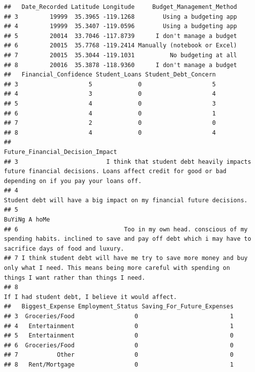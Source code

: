 \documentclass[
]{article}
\begin{document}
\begin{verbatim}
##   Date_Recorded Latitude Longitude     Budget_Management_Method
## 3         19999  35.3965 -119.1268        Using a budgeting app
## 4         19999  35.3407 -119.0596        Using a budgeting app
## 5         20014  33.7046 -117.8739      I don't manage a budget
## 6         20015  35.7768 -119.2414 Manually (notebook or Excel)
## 7         20015  35.3044 -119.1031          No budgeting at all
## 8         20016  35.3878 -118.9360      I don't manage a budget
##   Financial_Confidence Student_Loans Student_Debt_Concern
## 3                    5             0                    5
## 4                    3             0                    4
## 5                    4             0                    3
## 6                    4             0                    1
## 7                    2             0                    0
## 8                    4             0                    4
##                                                                                                                                             Future_Financial_Decision_Impact
## 3                         I think that student debt heavily impacts future financial decisions. Loans affect credit for good or bad depending on if you pay your loans off. 
## 4                                                                                                      Student debt will have a big impact on my financial future decisions.
## 5                                                                                                                                                             BuYiNg A hoMe 
## 6                              Too in my own head. conscious of my spending habits. inclined to save and pay off debt which i may have to sacrifice days of food and luxury.
## 7 I think student debt will have me try to save more money and buy only what I need. This means being more careful with spending on things I want rather than things I need.
## 8                                                                                                                         If I had student debt, I believe it would affect. 
##   Biggest_Expense Employment_Status Saving_For_Future_Expenses
## 3  Groceries/Food                 0                          1
## 4   Entertainment                 0                          1
## 5   Entertainment                 0                          0
## 6  Groceries/Food                 0                          0
## 7           Other                 0                          0
## 8   Rent/Mortgage                 0                          1

\end{verbatim}
\end{document}
